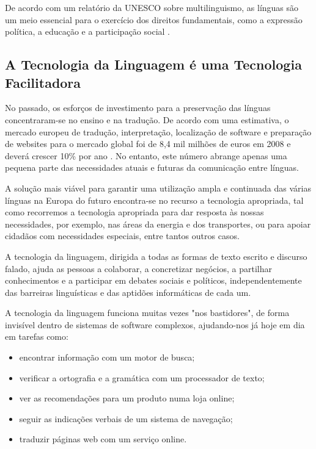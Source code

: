 \begin{multicols}{2}

De acordo com um relatório da UNESCO sobre multilinguismo, as línguas são um meio essencial para o exercício dos direitos fundamentais, como a expressão política, a educação e a participação social \cite{Unesco1}.

\subsection{A Tecnologia da Linguagem é uma Tecnologia Facilitadora}

 No passado, os esforços de investimento para a preservação das línguas concentraram-se no ensino e na tradução. 
De acordo com uma estimativa, o mercado europeu de tradução, interpretação, localização de software e preparação 
de websites para o mercado global foi de 8,4 mil milhões de euros em 2008 e deverá crescer 10\% por ano \cite{EC3}. 
No entanto, este número abrange apenas uma pequena parte das necessidades atuais e futuras da comunicação entre línguas. 

A solução mais viável para garantir uma utilização ampla e continuada das várias línguas na Europa do futuro 
encontra-se no recurso a tecnologia apropriada, tal como recorremos a tecnologia apropriada para dar 
resposta às nossas necessidades, por exemplo, nas áreas da energia e dos transportes, ou para apoiar cidadãos 
com necessidades especiais, entre tantos outros casos.

A tecnologia da linguagem, dirigida a todas as formas de texto escrito e discurso falado,
ajuda as pessoas a colaborar, a concretizar negócios, a partilhar conhecimentos e a participar 
em debates sociais e políticos, independentemente das barreiras linguísticas e das aptidões 
informáticas de cada um. 

A tecnologia da linguagem funciona muitas vezes "nos bastidores", 
de forma invisível dentro de sistemas de software complexos, ajudando-nos já hoje em dia em tarefas como:

\begin{itemize}
  \item encontrar informação com um motor de busca;
      \item verificar a ortografia e a gramática com um processador de texto;
      \item ver as recomendações para um produto numa loja online;
      \item seguir as indicações verbais de um sistema de navegação;
      \item traduzir páginas web com um serviço online.
\end{itemize}


\end{multicols}
